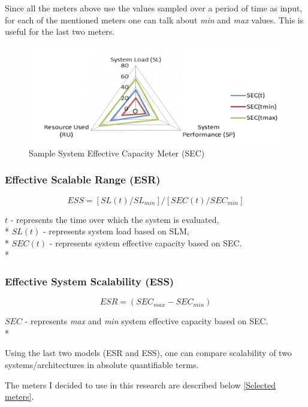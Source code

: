 \documentclass{uvamscse}
\begin{document}
Since all the meters above use the values sampled over a period of time as input, for each of the mentioned meters one can talk about \textit{min} and \textit{max} values. This is useful for the last two meters.

\begin{figure}[h]
\centering
\includegraphics[scale=0.3]{sec}
\caption{Sample System Effective Capacity Meter (SEC)}
\label{figure:sec}
\end{figure}

\subsubsection{Effective Scalable Range (ESR)}
\begin{center}
  $$ESS = [SL(t) / SL_{min}] / [SEC(t) / SEC_{min}]$$
\end{center}
  \texttt{$t$} - represents the time over which the system is evaluated, \\*
  \texttt{$SL(t)$} - represents system load based on SLM, \\*
  \texttt{$SEC(t)$} - represents system effective capacity based on SEC. \\*

\subsubsection{Effective System Scalability (ESS)}
\begin{center}
  $$ESR = (SEC_{max} - SEC_{min})$$
\end{center}
  \texttt{$SEC$} - represents \textit{max} and \textit{min} system effective capacity based on SEC. \\*

Using the last two models (ESR and ESS), one can compare scalability of two systems/architectures in absolute quantifiable terms.

The meters I decided to use in this research are described below \ref{Selected meters}.
\end{document}
